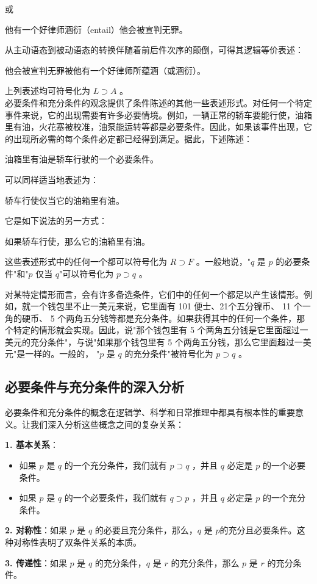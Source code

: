 或

他有一个好律师涵衍（entail）他会被宣判无罪。

从主动语态到被动语态的转换伴随着前后件次序的颠倒，可得其逻辑等价表述：

他会被宣判无罪被他有一个好律师所蕴涵（或涵衍）。

上列表述均可符号化为 $L \supset A$ 。\\
必要条件和充分条件的观念提供了条件陈述的其他一些表述形式。对任何一个特定事件来说，它的出现需要有许多必要情境。例如，一辆正常的轿车要能行使，油箱里有油，火花塞被校准，油泵能运转等都是必要条件。因此，如果该事件出现，它的出现所必需的每个条件必定都已经得到满足。据此，下述陈述：

油箱里有油是轿车行驶的一个必要条件。

可以同样适当地表述为：

轿车行使仅当它的油箱里有油。

它是如下说法的另一方式：

如果轿车行使，那么它的油箱里有油。

这些表述形式中的任何一个都可以符号化为 $R \supset F$ 。一般地说，"$q$ 是 $p$ 的必要条件"和"$p$ 仅当 $q$"可以符号化为 $p \supset q$ 。

对某特定情形而言，会有许多备选条件，它们中的任何一个都足以产生该情形。例如，就一个钱包里不止一美元来说，它里面有 101 便士、21个五分镍币、 11 个一角的硬币、 5 个两角五分钱等都是充分条件。如果获得其中的任何一个条件，那个特定的情形就会实现。因此，说"那个钱包里有 5 个两角五分钱是它里面超过一美元的充分条件"，与说"如果那个钱包里有 5 个两角五分钱，那么它里面超过一美元"是一样的。一般的， "$p$ 是 $q$ 的充分条件"被符号化为 $p \supset q$ 。

\subsection{必要条件与充分条件的深入分析}

必要条件和充分条件的概念在逻辑学、科学和日常推理中都具有根本性的重要意义。让我们深入分析这些概念之间的复杂关系：

\begin{theorembox}[title=必要条件与充分条件的逻辑关系]
\textbf{1. 基本关系}：
\begin{itemize}
\item 如果 $p$ 是 $q$ 的一个充分条件，我们就有 $p \supset q$ ，并且 $q$ 必定是 $p$ 的一个必要条件。
\item 如果 $p$ 是 $q$ 的一个必要条件，我们就有 $q \supset p$ ，并且 $q$ 必定是 $p$ 的一个充分条件。
\end{itemize}

\textbf{2. 对称性}：如果 $p$ 是 $q$ 的必要且充分条件，那么，$q$ 是 $p$的充分且必要条件。这种对称性表明了双条件关系的本质。

\textbf{3. 传递性}：如果 $p$ 是 $q$ 的充分条件，$q$ 是 $r$ 的充分条件，那么 $p$ 是 $r$ 的充分条件。
\end{theorembox}

